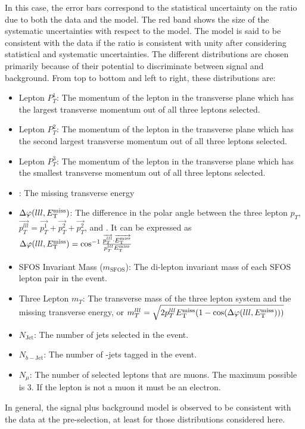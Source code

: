 In this case, the error bars correspond to the statistical uncertainty
on the ratio due to both the data and the model. The red band
shows the size of the systematic uncertainties with respect to the model.
The model is said to be consistent with the data
if the ratio is consistent with unity after considering statistical
and systematic uncertainties.
The different distributions are chosen primarily because 
of their potential to discriminate between signal and background. 
From top to bottom and left to right,
these distributions are: 
\begin{itemize}
\item Lepton $P_{T}^{1}$:  The momentum of the lepton in the transverse plane
which has the largest transverse momentum out of all three leptons selected.
\item Lepton $P_{T}^{2}$:  The momentum of the lepton in the transverse plane
which has the second largest transverse momentum out of all three leptons selected.
\item Lepton $P_{T}^{3}$:  The momentum of the lepton in the transverse plane
which has the smallest transverse momentum out of all three leptons selected.
\item \MET:  The missing transverse energy
\item $\Delta\varphi(lll,E_{\mathrm{T}}^{\mathrm{miss}})$:  The difference in the polar angle 
between the three lepton $p_{T}$, 
$\overrightarrow{p_{T}^{lll}} =  \overrightarrow{p_{T}^{1}}+ 
\overrightarrow{p_{T}^{2}}+ \overrightarrow{p_{T}^{2}}$, 
and \MET. It can be expressed as 
$\Delta\varphi(lll,E_{\mathrm{T}}^{\mathrm{miss}}) = \cos^{-1}\frac{ \overrightarrow{p_{T}^{lll}}\cdot\overrightarrow{E_{\mathrm{T}}^{\mathrm{miss}}} }{ p_{T}^{lll}E_{\mathrm{T}}^{\mathrm{miss}} } $
\item SFOS Invariant Mass ($m_{\textrm{SFOS}}$): The di-lepton invariant mass
of each SFOS lepton pair in the event. %
\item Three Lepton $m_{T}$: The transverse mass of the three lepton system
and the missing transverse energy, or
$m_{T}^{lll} = \sqrt{2p_{T}^{lll}E_{\mathrm{T}}^{\mathrm{miss}}(1-\cos(\Delta\varphi(lll,E_{\mathrm{T}}^{\mathrm{miss}})))}$ 
\item $N_{\textrm{Jet}}$: The number of jets selected in the event.
\item $N_{b-\textrm{Jet}}$: The number of \bee-jets tagged in the event.
\item $N_{\mu}$: The number of selected leptons that are muons. The maximum
possible is 3. If the lepton is not a muon it must be an electron.
\end{itemize}
In general, the signal plus background model is observed to be consistent
with the data at the pre-selection, at least for those distributions
considered here.




